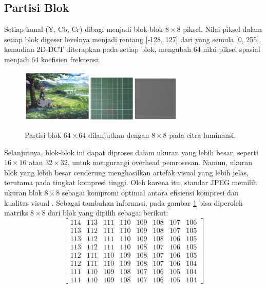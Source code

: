 \documentclass[a4paper]{article}
\begin{document}
\subsection{Partisi Blok}
Setiap kanal (Y, Cb, Cr) dibagi menjadi blok-blok $8 \times 8$ piksel. Nilai piksel dalam setiap blok digeser levelnya menjadi rentang [-128, 127] dari yang semula [0, 255], kemudian 2D-DCT diterapkan pada setiap blok, mengubah 64 nilai piksel spasial menjadi 64 koefisien frekuensi.

\begin{figure}[h!]
  \centering
  \includegraphics[width=0.3\textwidth]{img/partition1.png}\qquad\includegraphics[width=0.2\textwidth]{img/partition2.png}\qquad\includegraphics[width=0.2\textwidth]{img/partition3.png}
  \caption{Partisi blok $64 \times 64$ dilanjutkan dengan $8\times 8$ pada citra luminansi.}
  \label{fig:block_partition}
\end{figure}

Selanjutnya, blok-blok ini dapat diproses dalam ukuran yang lebih besar, seperti $16 \times 16$ atau $32 \times 32$, untuk mengurangi overhead pemrosesan. Namun, ukuran blok yang lebih besar cenderung menghasilkan artefak visual yang lebih jelas, terutama pada tingkat kompresi tinggi. Oleh karena itu, standar JPEG memilih ukuran blok $8 \times 8$ sebagai kompromi optimal antara efisiensi kompresi dan kualitas visual \cite{wallace1991jpeg}. Sebagai tambahan informasi, pada gambar \ref{fig:block_partition} bisa diperoleh matriks $8 \times 8$ dari blok yang dipilih sebagai berikut:
\[
  \begin{bmatrix}
    114 & 113 & 111 & 110 & 109 & 108 & 107 & 106 \\
    113 & 112 & 111 & 110 & 109 & 108 & 107 & 105 \\
    113 & 112 & 111 & 110 & 109 & 108 & 106 & 105 \\
    113 & 112 & 111 & 110 & 108 & 107 & 106 & 105 \\
    112 & 111 & 110 & 109 & 108 & 107 & 106 & 105 \\
    112 & 111 & 110 & 109 & 108 & 107 & 106 & 104 \\
    111 & 110 & 109 & 108 & 107 & 106 & 105 & 104 \\
    111 & 110 & 109 & 108 & 107 & 106 & 105 & 104
  \end{bmatrix}
\]
\end{document}
